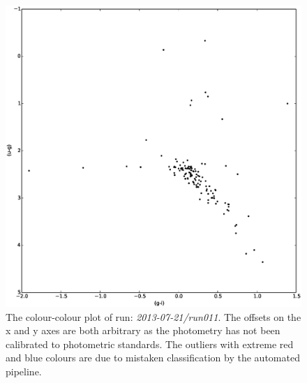 \begin{figure}
\centering
\includegraphics[width=120mm]{images/2013-07-21-run011-2colour.eps}
\caption{The colour-colour plot of run: \emph{2013-07-21/run011}. The offsets on the x and y axes are both arbitrary as the photometry has not been calibrated to photometric standards. The outliers with extreme red and blue colours are due to mistaken classification by the automated pipeline. }
\label{fig:differentialtrad}
\end{figure}



